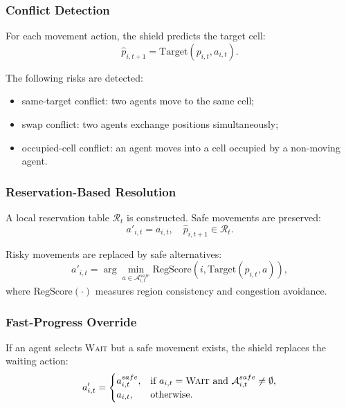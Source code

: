 \documentclass[fleqn,10pt]{wlpeerj}
\begin{document}
\subsubsection{Conflict Detection}

For each movement action, the shield predicts the target cell:
\begin{equation}
\hat{p}_{i,t+1}
=
\mathrm{Target}(p_{i,t}, a_{i,t}).
\end{equation}

The following risks are detected:
\begin{itemize}
    \item same-target conflict: two agents move to the same cell;
    \item swap conflict: two agents exchange positions simultaneously;
    \item occupied-cell conflict: an agent moves into a cell occupied by a non-moving agent.
\end{itemize}

\subsubsection{Reservation-Based Resolution}

A local reservation table $\mathcal{R}_t$ is constructed. Safe movements are preserved:
\begin{equation}
a'_{i,t} = a_{i,t}, \quad
\hat{p}_{i,t+1} \in \mathcal{R}_t.
\end{equation}

Risky movements are replaced by safe alternatives:
\begin{equation}
a'_{i,t}
=
\arg\min_{a \in \mathcal{A}^{safe}_{i,t}}
\mathrm{RegScore}
\left(
i,
\mathrm{Target}(p_{i,t},a)
\right),
\end{equation}
where $\mathrm{RegScore}(\cdot)$ measures region consistency and congestion avoidance.

\subsubsection{Fast-Progress Override}

If an agent selects \textsc{Wait} but a safe movement exists, the shield replaces the waiting action:
\begin{equation}
a'_{i,t}
=
\begin{cases}
a^{safe}_{i,t}, & \text{if } a_{i,t}=\textsc{Wait} \text{ and } \mathcal{A}^{safe}_{i,t}\neq \emptyset,\\
a_{i,t}, & \text{otherwise}.
\end{cases}
\end{equation}
\end{document}
